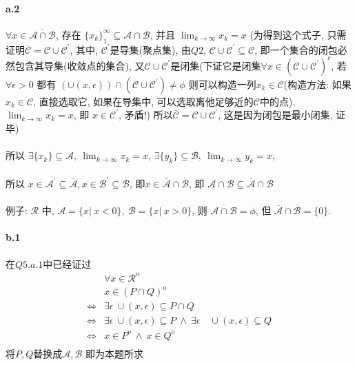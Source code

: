 \documentclass{article}
\begin{document}
\begin{CJK}{UTF8}{gbsn}
  \paragraph{a.2}
    $\forall x \in \overline{\mathcal{A} \cap \mathcal{B}}$, 存在 $\{x_k\}_1^{\infty} \subseteq \mathcal{A} \cap \mathcal{B}$, 并且 $\lim_{k \to \infty} x_k = x$ (为得到这个式子, 只需证明$\overline{\mathcal{C}} = \mathcal{C} \cup \mathcal{C}^{'}$, 其中, $\mathcal{C}^{'}$是导集(聚点集), 由$Q2$, $\mathcal{C} \cup \mathcal{C}^{'} \subseteq \mathcal{C}$, 即一个集合的闭包必然包含其导集(收敛点的集合), 又$\mathcal{C} \cup \mathcal{C}^{'}$是闭集(下证它是闭集$\forall x \in (\mathcal{C} \cup \mathcal{C}^{'})^c$, 若$\forall \epsilon > 0$ 都有 $(\cup(x, \epsilon)) \cap (\mathcal{C} \cup \mathcal{C}^{'}) \not= \phi$ 则可以构造一列$x_k \in \mathcal{C}$(构造方法: 如果$x_k \in \mathcal{C}$, 直接选取它, 如果在导集中, 可以选取离他足够近的$\mathcal{C}$中的点), $\lim_{k \to \infty} x_k = x$, 即 $x \in \mathcal{C}^{'}$, 矛盾!) 所以$\overline{\mathcal{C}} = \mathcal{C} \cup \mathcal{C}^{'}$, 这是因为闭包是最小闭集, 证毕)
    \paragraph{}
    所以 $\exists \{x_k\} \subseteq \mathcal{A},\ \lim_{k \to \infty} x_k = x$, $\exists \{y_k\} \subseteq \mathcal{B},\ \lim_{k \to \infty} y_k = x$,
    \paragraph{}
    所以 $x \in \mathcal{A}^{'} \subseteq \overline{\mathcal{A}}, x \in \mathcal{B}^{'} \subseteq \overline{\mathcal{B}}$, 即$x \in \overline{\mathcal{A}} \cap \overline{\mathcal{B}}$, 即 $\overline{\mathcal{A} \cap \mathcal{B}} \subseteq \overline{\mathcal{A}} \cap \overline{\mathcal{B}}$
    \paragraph{}
    例子: $\mathcal{R}$ 中, $\mathcal{A} = \{x |\ x < 0\},\ \mathcal{B} = \{x |\ x > 0\}$, 则 $\overline{\mathcal{A} \cap \mathcal{B}} = \phi$, 但 $\overline{\mathcal{A}} \cap \overline{\mathcal{B}} = \{0\}$.
  \paragraph{b.1}
    在$Q5.a.1$中已经证过
    \begin{equation}
      \begin{aligned}
        & \forall x \in \mathcal{R}^n \\
        & x \in (P \cap Q)^o \\
        \iff & \exists \epsilon \ \cup (x, \epsilon) \subseteq P \cap Q \\
        \iff & \exists \epsilon \ \cup (x, \epsilon) \subseteq P \ \land\  \exists \epsilon \quad \cup (x, \epsilon) \subseteq Q \\
        \iff & x \in P^o \ \land\  x \in Q^o \\
      \end{aligned}
    \end{equation}
    将$P,Q$替换成$\mathcal{A}, \mathcal{B}$ 即为本题所求

\end{CJK}
\end{document}
